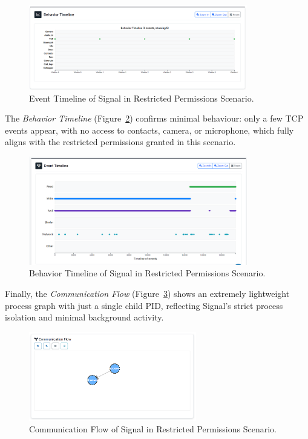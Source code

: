 \documentclass[a4paper,12pt]{report}
\begin{document}
\begin{figure}[H]
    \centering
    \includegraphics[width=0.85\textwidth]{signal-none-events.png}
    \caption{Event Timeline of Signal in Restricted Permissions Scenario.}
    \label{fig:signal-none-events}
\end{figure}

The \textit{Behavior Timeline} (Figure~\ref{fig:signal-none-behav}) confirms minimal behaviour: only a few TCP events appear, with no access to contacts, camera, or microphone, which fully aligns with the restricted permissions granted in this scenario.

\begin{figure}[H]
    \centering
    \includegraphics[width=0.85\textwidth]{signal-none-behav.png}
    \caption{Behavior Timeline of Signal in Restricted Permissions Scenario.}
    \label{fig:signal-none-behav}
\end{figure}

Finally, the \textit{Communication Flow} (Figure~\ref{fig:signal-none-flow}) shows an extremely lightweight process graph with just a single child PID, reflecting Signal’s strict process isolation and minimal background activity.

\begin{figure}[H]
    \centering
    \includegraphics[width=0.65\textwidth]{signal-none-flow.png}
    \caption{Communication Flow of Signal in Restricted Permissions Scenario.}
    \label{fig:signal-none-flow}
\end{figure}
\end{document}
